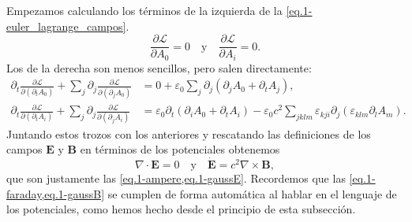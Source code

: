 Empezamos calculando los términos de la izquierda de la \cref{eq.1-euler_lagrange_campos}.
\begin{equation*}
    \frac{\partial \mathcal{L}}{\partial A_0} = 0\quad\text{y}\quad\frac{\partial \mathcal{L}}{\partial A_i} = 0.
\end{equation*}
Los de la derecha son menos sencillos, pero salen directamente:
\begin{align*}
    \partial_t\frac{\partial\mathcal{L}}{\partial(\partial_t A_0)} + \sum_j\partial_j \frac{\partial\mathcal{L}}{\partial(\partial_j A_0)} &= 0 + \varepsilon_0\sum_j \partial_j\left(\partial_j A_0 + \partial_t A_j\right),\\
    \partial_t\frac{\partial\mathcal{L}}{\partial(\partial_t A_i)} + \sum_j\partial_j \frac{\partial\mathcal{L}}{\partial(\partial_j A_i)} &= \varepsilon_0\partial_t\left(\partial_i A_0 + \partial_t A_i\right) - \varepsilon_0 c^2\sum_{jklm} \varepsilon_{kji}\partial_j\left(\varepsilon_{klm}\partial_l A_m\right).
\end{align*}
Juntando estos trozos con los anteriores y rescatando las definiciones de los campos \(\mathbf{E}\) y \(\mathbf{B}\) en términos de los potenciales obtenemos
\begin{equation}
    \nabla\cdot \mathbf{E} = 0\quad\text{y}\quad \dot{\mathbf{E}} = c^2\nabla\times\mathbf{B}, 
\end{equation}
que son justamente las \cref{eq.1-ampere,eq.1-gaussE}. Recordemos que las \cref{eq.1-faraday,eq.1-gaussB} se cumplen de forma automática al hablar en el lenguaje de los potenciales, como hemos hecho desde el principio de esta subsección.

